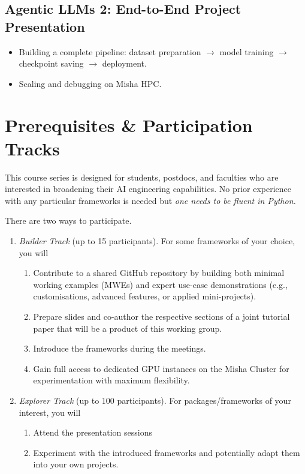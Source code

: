 \documentclass[12pt]{article}
\begin{document}
\subsection{Agentic LLMs 2: End-to-End Project Presentation}
\begin{itemize}
    \item Building a complete pipeline: dataset preparation $\rightarrow$ model training $\rightarrow$ checkpoint saving $\rightarrow$ deployment.
    \item Scaling and debugging on Misha HPC.
\end{itemize}


\section{Prerequisites \& Participation Tracks}
This course series is designed for students, postdocs, and faculties who are interested in broadening their AI engineering capabilities.  No prior experience with any particular frameworks is needed but \emph{one needs to be fluent in Python.}

There are two ways to participate. 
\begin{enumerate}
    \item \emph{Builder Track} (up to 15 participants).  For some frameworks of your choice, you will
    \begin{enumerate}
    \item Contribute to a shared GitHub repository by building both minimal working examples (MWEs) and expert use-case demonstrations  (e.g., customisations, advanced features, or applied mini-projects).
    \item Prepare slides and co-author the respective sections of a joint tutorial paper that will be a product of this working group. 
    \item Introduce the frameworks during the meetings. 
    \item Gain full access to dedicated GPU instances on the Misha Cluster for experimentation with maximum flexibility. 
\end{enumerate}
    \item \emph{Explorer Track} (up to 100 participants).  For packages/frameworks of your interest, you will    
    \begin{enumerate}
    \item Attend the presentation sessions
    \item Experiment with the introduced frameworks and potentially adapt them into your own projects.
\end{enumerate}
\end{enumerate}
\end{document}

